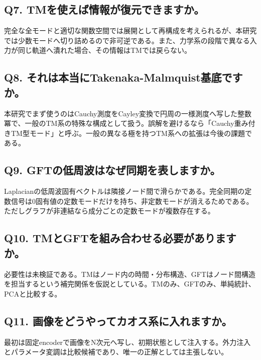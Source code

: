 \documentclass[11pt,a4paper]{ltjsarticle}
\begin{document}
\subsection*{\textcolor{researchblue}{Q7. TMを使えば情報が復元できますか。}}

完全な全モードと適切な関数空間では展開として再構成を考えられるが、本研究では少数モードへ切り詰めるので非可逆である。また、力学系の段階で異なる入力が同じ軌道へ潰れた場合、その情報はTMでは戻らない。\par

\subsection*{\textcolor{researchblue}{Q8. それは本当にTakenaka-Malmquist基底ですか。}}

本研究でまず使うのはCauchy測度をCayley変換で円周の一様測度へ写した整数冪で、一般のTM系の特殊な構成として扱う。誤解を避けるなら「Cauchy重み付きTM型モード」と呼ぶ。一般の異なる極を持つTM系への拡張は今後の課題である。\par

\subsection*{\textcolor{researchblue}{Q9. GFTの低周波はなぜ同期を表しますか。}}

Laplacianの低周波固有ベクトルは隣接ノード間で滑らかである。完全同期の定数信号は0固有値の定数モードだけを持ち、非定数モードが消えるためである。ただしグラフが非連結なら成分ごとの定数モードが複数存在する。\par

\subsection*{\textcolor{researchblue}{Q10. TMとGFTを組み合わせる必要がありますか。}}

必要性は未検証である。TMはノード内の時間・分布構造、GFTはノード間構造を担当するという補完関係を仮説としている。TMのみ、GFTのみ、単純統計、PCAと比較する。\par

\subsection*{\textcolor{researchblue}{Q11. 画像をどうやってカオス系に入れますか。}}

最初は固定encoderで画像をN次元へ写し、初期状態として注入する。外力注入とパラメータ変調は比較候補であり、唯一の正解としては主張しない。\par
\end{document}
